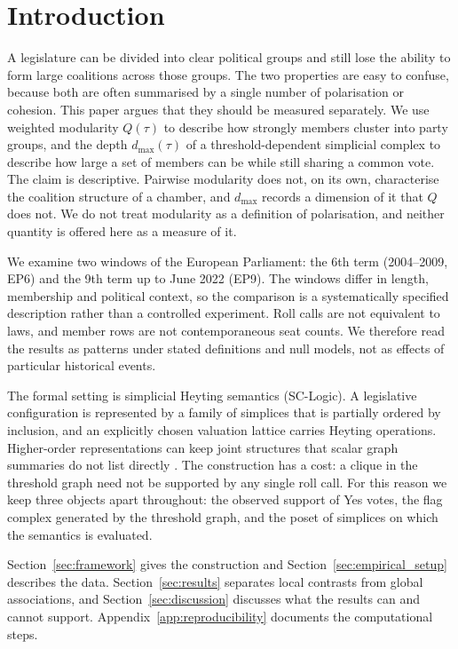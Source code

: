 \documentclass[a4paper,fleqn,oneside]{cas-sc}
\theoremstyle{definition}
\theoremstyle{plain}
\begin{document}
\section{Introduction}\label{sec:introduction}

A legislature can be divided into clear political groups and still lose the
ability to form large coalitions across those groups. The two properties are
easy to confuse, because both are often summarised by a single number of
polarisation or cohesion. This paper argues that they should be measured
separately. We use weighted modularity $Q(\tau)$ to describe how strongly
members cluster into party groups, and the depth $d_{\max}(\tau)$ of a
threshold-dependent simplicial complex to describe how large a set of members
can be while still sharing a common vote. The claim is descriptive. Pairwise
modularity does not, on its own, characterise the coalition structure of a
chamber, and $d_{\max}$ records a dimension of it that $Q$ does not. We do not
treat modularity as a definition of polarisation, and neither quantity is
offered here as a measure of it.

We examine two windows of the European Parliament: the 6th term (2004--2009,
EP6) and the 9th term up to June 2022 (EP9). The windows differ in length,
membership and political context, so the comparison is a systematically
specified description rather than a controlled experiment. Roll calls are not
equivalent to laws, and member rows are not contemporaneous seat counts. We
therefore read the results as patterns under stated definitions and null
models, not as effects of particular historical events.

The formal setting is simplicial Heyting semantics (SC-Logic). A legislative
configuration is represented by a family of simplices that is partially
ordered by inclusion, and an explicitly chosen valuation lattice carries
Heyting operations. Higher-order representations can keep joint structures
that scalar graph summaries do not list directly \citep{BensonGleichLeskovec2016,
BattistonEtAl2020}. The construction has a cost: a clique in the threshold
graph need not be supported by any single roll call. For this reason we keep
three objects apart throughout: the observed support of Yes votes, the flag
complex generated by the threshold graph, and the poset of simplices on which
the semantics is evaluated.

Section~\ref{sec:framework} gives the construction and Section~\ref{sec:empirical_setup}
describes the data. Section~\ref{sec:results} separates local contrasts from
global associations, and Section~\ref{sec:discussion} discusses what the
results can and cannot support. Appendix~\ref{app:reproducibility} documents
the computational steps.
\end{document}
